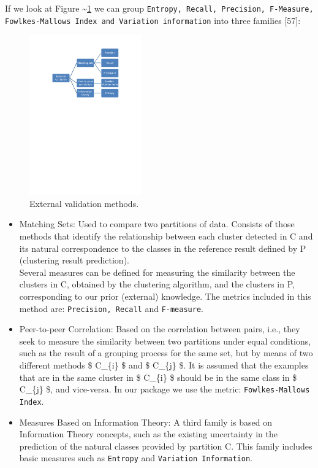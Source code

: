 \documentclass[
]{article}
\begin{document}
If we look at Figure \textasciitilde{}\ref{external} we can group
\texttt{Entropy, Recall, Precision, F-Measure, Fowlkes-Mallows Index and Variation information}
into three families {[}57{]}:

\begin{figure}
\centering
\includegraphics[width=\textwidth,height=2.70833in]{img/external.pdf}
\caption{External validation methods. \label{external}}
\end{figure}

\begin{itemize}
\item
  Matching Sets: Used to compare two partitions of data. Consists of
  those methods that identify the relationship between each cluster
  detected in C and its natural correspondence to the classes in the
  reference result defined by P (clustering result prediction).\\
  Several measures can be defined for measuring the similarity between
  the clusters in C, obtained by the clustering algorithm, and the
  clusters in P, corresponding to our prior (external) knowledge. The
  metrics included in this method are: \texttt{Precision, Recall} and
  \texttt{F-measure}.
\item
  Peer-to-peer Correlation: Based on the correlation between pairs,
  i.e., they seek to measure the similarity between two partitions under
  equal conditions, such as the result of a grouping process for the
  same set, but by means of two different methods \$ C\_\{i\} \$ and \$
  C\_\{j\} \$. It is assumed that the examples that are in the same
  cluster in \$ C\_\{i\} \$ should be in the same class in \$ C\_\{j\}
  \$, and vice-versa. In our package we use the metric:
  \texttt{Fowlkes-Mallows Index}.
\item
  Measures Based on Information Theory: A third family is based on
  Information Theory concepts, such as the existing uncertainty in the
  prediction of the natural classes provided by partition C. This family
  includes basic measures such as \texttt{Entropy} and
  \texttt{Variation Information}.
\end{itemize}
\end{document}

